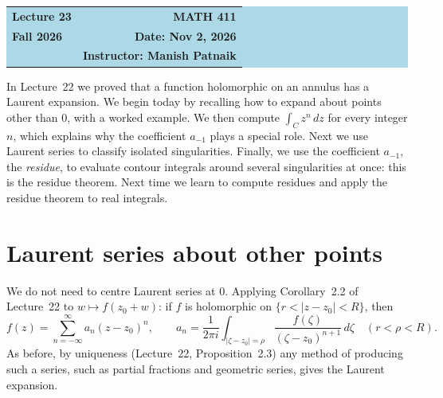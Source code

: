\documentclass[11pt]{article}
\theoremstyle{plain}
\theoremstyle{definition}
\theoremstyle{remark}
\numberwithin{equation}{section}
\begin{document}
\begin{center}
  \colorbox{lightblue}{%
    \begin{minipage}{0.94\textwidth}
      \vspace{0.55em}
      \begin{tabular*}{\textwidth}{@{\extracolsep{\fill}}lr}
        {\color{courseblue}\bfseries\LARGE Lecture 23} &
        {\color{courseblue}\bfseries\LARGE MATH 411}\\[0.35em]
        \textbf{Fall 2026} & \textbf{Date: Nov 2, 2026}\\
        & \textbf{Instructor: Manish Patnaik}
      \end{tabular*}
      \vspace{0.45em}
    \end{minipage}}
\end{center}

\setcounter{tocdepth}{1}
\tableofcontents
\vspace{0.45em}

In Lecture~22 we proved that a function holomorphic on an annulus has a
Laurent expansion. We begin today by recalling how to expand about points
other than $0$, with a worked example. We then compute $\int_C z^n\,dz$ for
every integer $n$, which explains why the coefficient $a_{-1}$ plays a
special role. Next we use Laurent series to classify isolated singularities.
Finally, we use the coefficient $a_{-1}$, the \emph{residue}, to evaluate
contour integrals around several singularities at once: this is the
residue theorem. Next time we learn to compute residues and apply the
residue theorem to real integrals.

\section{Laurent series about other points}\label{sec:other-points}
We do not need to centre Laurent series at $0$. Applying Corollary~2.2 of
Lecture~22 to $w\mapsto f(z_0+w)$: if $f$ is holomorphic on
$\{r<|z-z_0|<R\}$, then
\begin{equation}
 f(z)=\sum_{n=-\infty}^{\infty}a_n(z-z_0)^n,\qquad
 a_n=\frac{1}{2\pi i}\int_{|\zeta-z_0|=\rho}
 \frac{f(\zeta)}{(\zeta-z_0)^{n+1}}\,d\zeta\quad(r<\rho<R).
\end{equation}
As before, by uniqueness (Lecture~22, Proposition~2.3) any method of
producing such a series, such as partial fractions and geometric series,
gives the Laurent expansion.
\end{document}
